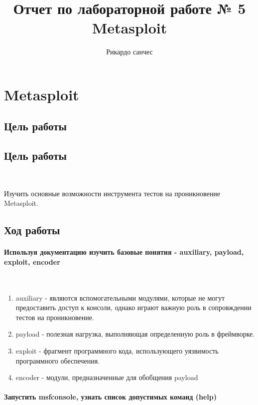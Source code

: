 \documentclass[10pt,a4paper]{article}
\author{Рикардо санчес}
\date{}
\title{Отчет по лабораторной работе № 5 Metasploit}
\begin{document}
\maketitle

\newpage

\section{Metasploit}

\subsection{Цель работы}

\subsection{Цель работы}
~

Изучить основные возможности инструмента тестов на проникновение Metasploit.
\subsection{Ход работы}

\paragraph{Используя документацию изучить базовые понятия - auxiliary, payload, exploit, encoder}
~

\begin{enumerate}
\item auxiliary - являются вспомогательными модулями, которые не могут предоставить доступ к консоли, однако играют важную роль в сопровждении тестов на проникновение.

\item payload - полезная нагрузка, выполняющая определенную роль в фреймворке.

\item exploit - фрагмент программного кода, использующего уязвимость программного обеспечения.

\item encoder - модули, предназначенные для обобщения payload
\end{enumerate}

\paragraph{Запустить msfconsole, узнать список допустимых команд (help)}
~
\end{document}
